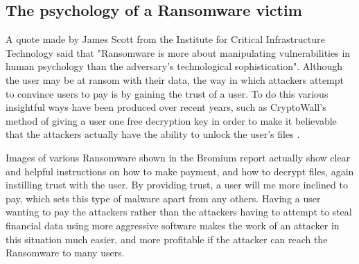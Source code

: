 \documentclass[journal,comsoc]{IEEEtran}
\begin{document}
\subsection{The psychology of a Ransomware victim}
A quote made by James Scott from the Institute for Critical Infrastructure Technology said that "Ransomware is more about manipulating vulnerabilities in human psychology than the     adversary's technological sophistication". Although the user may be at ransom with their data, the way in which attackers attempt to convince users to pay is by gaining the trust of a user. To do this various insightful ways have been produced over recent years, such as CryptoWall's method of giving a user one free decryption key in order to make it believable that the attackers actually have the ability to unlock the user's files \cite{paper4}. \par
Images of various Ransomware shown in the Bromium report actually show clear and helpful instructions on how to make payment, and how to decrypt files, again instilling trust with the user. By providing trust, a user will me more inclined to pay, which sets this type of malware apart from any others. Having a user wanting to pay the attackers rather than the attackers having to attempt to steal financial data using more aggressive software makes the work of an attacker in this situation much easier, and more profitable if the attacker can reach the Ransomware to many users. \par
\end{document}
